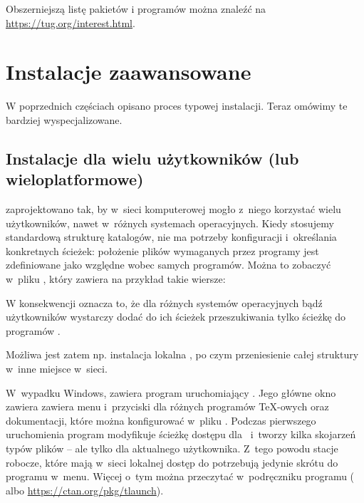 \documentclass{article}
\begin{document}
Obszerniejszą listę pakietów i programów można znaleźć na \url{https://tug.org/interest.html}.

\section{Instalacje zaawansowane}

W poprzednich częściach opisano proces typowej instalacji. Teraz
omówimy te bardziej wyspecjalizowane.

\subsection{Instalacje dla wielu użytkowników (lub wieloplatformowe)}
\label{sec:sharedinstall}

\TL{} zaprojektowano tak, by w~sieci komputerowej mogło z~niego
korzystać wielu użytkowników, nawet w~różnych systemach operacyjnych.
Kiedy stosujemy standardową strukturę katalogów, nie ma potrzeby konfiguracji
i~określania konkretnych ścieżek: położenie plików wymaganych przez
programy \TL{} jest zdefiniowane jako względne wobec samych
programów. Można to zobaczyć w~pliku
, który zawiera na przykład takie
wiersze:
W konsekwencji oznacza to, że dla różnych systemów operacyjnych bądź
użytkowników wystarczy dodać do ich ścieżek przeszukiwania tylko ścieżkę
do programów \TL{}.

Możliwa jest zatem np. instalacja lokalna \TL{}, po czym przeniesienie
całej struktury w~inne miejsce w~sieci.

W~wypadku Windows, \TL{} zawiera program uruchomiający
. Jego główne okno zawiera zawiera menu i~przyciski
dla różnych programów \TeX-owych oraz dokumentacji, które można
konfigurować w~pliku . Podczas pierwszego uruchomienia
program modyfikuje ścieżkę dostępu dla \TL\ i~tworzy kilka skojarzeń
typów plików -- ale tylko dla aktualnego użytkownika.  Z~tego powodu
stacje robocze, które mają w~sieci lokalnej dostęp do \TL{} potrzebują
jedynie skrótu do programu  w~menu. Więcej o~tym
można przeczytać w~podręczniku programu  (
albo \url{https://ctan.org/pkg/tlaunch}).

\end{document}
